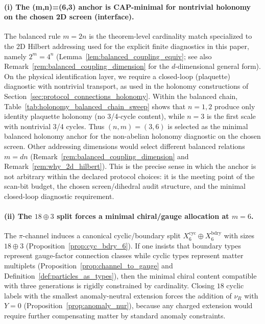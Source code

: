 \paragraph{(i) The (m,n)=(6,3) anchor is CAP-minimal for nontrivial holonomy on the chosen 2D screen (interface).}
The balanced rule $m=2n$ is the theorem-level cardinality match specialized to the $2$D Hilbert addressing used for the explicit finite diagnostics in this paper, namely $2^m=4^n$ (Lemma~\ref{lem:balanced_coupling_equiv}; see also Remark~\ref{rem:balanced_coupling_dimension} for the $d$-dimensional general form).
On the physical identification layer, we require a closed-loop (plaquette) diagnostic with nontrivial transport, as used in the holonomy constructions of Section~\ref{sec:protocol_connections_holonomy}.
Within the balanced chain, Table~\ref{tab:holonomy_balanced_chain_sweep} shows that $n=1,2$ produce only identity plaquette holonomy (no 3/4-cycle content), while $n=3$ is the first scale with nontrivial 3/4 cycles.
Thus $(n,m)=(3,6)$ is selected as the minimal balanced holonomy anchor for the non-abelian holonomy diagnostic on the chosen screen.
Other addressing dimensions would select different balanced relations $m=dn$ (Remark~\ref{rem:balanced_coupling_dimension} and Remark~\ref{rem:why_2d_hilbert}).
This is the precise sense in which the anchor is not arbitrary within the declared protocol choices: it is the meeting point of the scan-bit budget, the chosen screen/dihedral audit structure, and the minimal closed-loop diagnostic requirement.

\paragraph{(ii) The \texorpdfstring{$18\oplus 3$}{18+3} split forces a minimal chiral/gauge allocation at \texorpdfstring{$m=6$}{m=6}.}
The $\pi$-channel induces a canonical cyclic/boundary split $X_6^{\mathrm{cyc}}\oplus X_6^{\mathrm{bdry}}$ with sizes $18\oplus 3$ (Proposition~\ref{prop:cyc_bdry_6}).
If one insists that boundary types represent gauge-factor connection classes while cyclic types represent matter multiplets (Proposition~\ref{prop:channel_to_gauge} and Definition~\ref{def:particles_as_types}), then the minimal chiral content compatible with three generations is rigidly constrained by cardinality.
Closing $18$ cyclic labels with the smallest anomaly-neutral extension forces the addition of $\nu_R$ with $Y=0$ (Proposition~\ref{prop:anomaly_nur}), because any charged extension would require further compensating matter by standard anomaly constraints.

